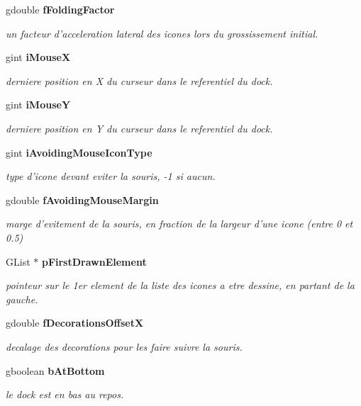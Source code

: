 \begin{CompactItemize}
gdouble {\bf fFoldingFactor}
\begin{CompactList}\small\item\em un facteur d'acceleration lateral des icones lors du grossissement initial. \item\end{CompactList}\item 
gint {\bf iMouseX}
\begin{CompactList}\small\item\em derniere position en X du curseur dans le referentiel du dock. \item\end{CompactList}\item 
gint {\bf iMouseY}
\begin{CompactList}\small\item\em derniere position en Y du curseur dans le referentiel du dock. \item\end{CompactList}\item 
gint {\bf iAvoidingMouseIconType}
\begin{CompactList}\small\item\em type d'icone devant eviter la souris, -1 si aucun. \item\end{CompactList}\item 
gdouble {\bf fAvoidingMouseMargin}
\begin{CompactList}\small\item\em marge d'evitement de la souris, en fraction de la largeur d'une icone (entre 0 et 0.5) \item\end{CompactList}\item 
GList $\ast$ {\bf pFirstDrawnElement}
\begin{CompactList}\small\item\em pointeur sur le 1er element de la liste des icones a etre dessine, en partant de la gauche. \item\end{CompactList}\item 
gdouble {\bf fDecorationsOffsetX}
\begin{CompactList}\small\item\em decalage des decorations pour les faire suivre la souris. \item\end{CompactList}\item 
gboolean {\bf bAtBottom}
\begin{CompactList}\small\item\em le dock est en bas au repos. \item\end{CompactList}\item 

\end{CompactItemize}
